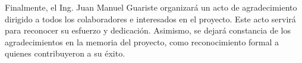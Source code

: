 \documentclass[
11pt, %
]{charter}
\begin{document}
Finalmente, el Ing. Juan Manuel Guariste organizará un acto de agradecimiento dirigido a todos los colaboradores e interesados en el proyecto. Este acto servirá para reconocer su esfuerzo y dedicación. Asimismo, se dejará constancia de los agradecimientos en la memoria del proyecto, como reconocimiento formal a quienes contribuyeron a su éxito.
\end{document}
